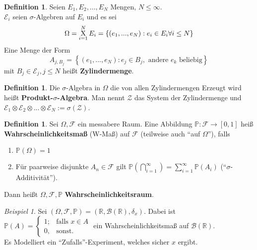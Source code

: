 \documentclass[10pt,a4paper]{article}
\newcommand{\R}{\ensuremath{\mathbb{R}}}
\newcommand{\Bor}{\mathscr B}
\newcommand{\Prb}{\mathbb P}
\newcommand{\scF}{\ensuremath{\mathscr{F}}}
\theoremstyle{plain}
\theoremstyle{definition}
\newtheorem{definition}[theorem]{Definition}
\theoremstyle{remark}
\newtheorem{exm}[theorem]{Beispiel}
\begin{document}
	\begin{definition}
		Seien $E_1,E_2,...,E_N$ Mengen, $N\leq \infty$.\\
		$\mathscr E_i$ seien $\sigma$-Algebren auf $E_i$ und es sei
		\[\Omega=\operatornamewithlimits{X}_{i=1}^NE_i=\left\{(e_1,...,e_N):e_i\in E_i\forall i\leq N\right\}\]
		Eine Menge der Form
		\[A_{j,B_j}=\left\{(e_1,...,e_N):e_j\in B_j,\text{ andere $e_k$ beliebig}\right\}\]
		mit $B_j\in\mathscr E_j,j\leq N$ heißt \textbf{Zylindermenge}.\\
	\end{definition}
	\addtocounter{theorem}{-1}
	\begin{definition}
		Die $\sigma$-Algebra in $\Omega$ die von allen Zylindermengen Erzeugt wird heißt \textbf{Produkt-$\sigma$-Algebra}.
		Man nennt $\mathscr Z$ das System der Zylindermenge und $\mathscr E_1\otimes\mathscr E_2\otimes...\otimes \mathscr E_N:=\sigma(\mathscr Z)$.
	\end{definition}

	\begin{definition}\label{0120def}
		Sei $\Omega,\scF$ ein messabere Raum. Eine Abbildung $\Prb:\scF\to [0,1]$ heiß \textbf{Wahrscheinlichkeitsmaß} (W-Maß) auf $\scF$ (teilweise auch \enquote{auf $\Omega$}), falls
		\begin{enumerate}[label=\alph*)]
			\item $\Prb(\Omega)=1$
			\item Für paarweise disjunkte $A_n\in\scF$ gilt $\Prb(\bigcap_{i=1}^\infty)=\sum_{i=1}^\infty \Prb(A_i)$ (\enquote{$\sigma$-Additivität}).
		\end{enumerate}
	Dann heißt $\Omega,\scF,\Prb$ \textbf{Wahrscheinlichkeitsraum}.
	\end{definition}

	\begin{exm}\label{0122exm}
		Sei $(\Omega,\scF,\Prb)=(\R,\Bor(\R),\delta_x)$. Dabei ist $\Prb(A)=\begin{cases}
		1;&\text{falls $x\in A$}\\0,&\text{sonst}.
		\end{cases}$ ein Wahrscheinlichkeitsmaß auf $\Bor(\R)$. \\
		Es Modelliert ein \enquote{Zufalls}-Experiment, welches sicher $x$ ergibt.
	\end{exm}
\end{document}
